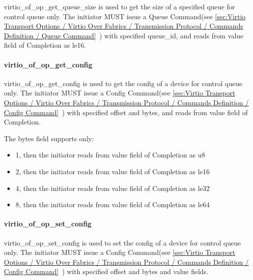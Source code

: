 virtio_of_op_get_queue_size is used to get the size of a specified queue for control queue only. The initiator MUST issue a Queue Command(see \ref{sec:Virtio Transport Options / Virtio Over Fabrics / Transmission Protocol / Commands Definition / Queue Command}~) with specified queue_id, and reads from value field of Completion as le16.

\paragraph{virtio_of_op_get_config}\label{sec:Virtio Transport Options / Virtio Over Fabrics / Transmission Protocol / Opcodes Definition / virtio_of_op_get_config}

virtio_of_op_get_config is used to get the config of a device for control queue only. The initiator MUST issue a Config Command(see \ref{sec:Virtio Transport Options / Virtio Over Fabrics / Transmission Protocol / Commands Definition / Config Command}~) with specified offset and bytes, and reads from value field of Completion.

The bytes field supports only:

\begin{itemize}
\item 1, then the initiator reads from value field of Completion as u8
\item 2, then the initiator reads from value field of Completion as le16
\item 4, then the initiator reads from value field of Completion as le32
\item 8, then the initiator reads from value field of Completion as le64
\end{itemize}

\paragraph{virtio_of_op_set_config}\label{sec:Virtio Transport Options / Virtio Over Fabrics / Transmission Protocol / Opcodes Definition / virtio_of_op_set_config}

virtio_of_op_set_config is used to set the config of a device for control queue only. The initiator MUST issue a Config Command(see \ref{sec:Virtio Transport Options / Virtio Over Fabrics / Transmission Protocol / Commands Definition / Config Command}~) with specified offset and bytes and value fields.

